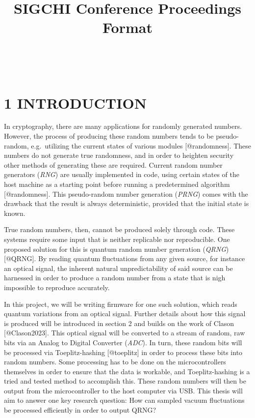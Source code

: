\documentclass{sigchi}
\def\plaintitle{SIGCHI Conference Proceedings Format}
\begin{document}
\title{\plaintitle}

\author{%
	\\
	\\
}

\maketitle

\section{1 INTRODUCTION}\label{introduction}

In cryptography, there are many applications for randomly generated
numbers. However, the process of producing these random numbers tends to
be pseudo-random, e.g.~utilizing the current states of various modules
{[}@randomness{]}. These numbers do not generate true randomness, and in
order to heighten security other methods of generating these are
required. Current random number generators (\emph{RNG}) are usually
implemented in code, using certain states of the host machine as a
starting point before running a predetermined algorithm
{[}@randomness{]}. This pseudo-random number generation (\emph{PRNG})
comes with the drawback that the result is always deterministic,
provided that the initial state is known.

True random numbers, then, cannot be produced solely through code. These
systems require some input that is neither replicable nor reproducible.
One proposed solution for this is quantum random number generation
(\emph{QRNG}) {[}@QRNG{]}. By reading quantum fluctuations from any
given source, for instance an optical signal, the inherent natural
unpredictability of said source can be harnessed in order to produce a
random number from a state that is nigh impossible to reproduce
accurately.

In this project, we will be writing firmware for one such solution,
which reads quantum variations from an optical signal. Further details
about how this signal is produced will be introduced in section 2 and
builds on the work of Clason {[}@Clason2023{]}. This optical signal will
be converted to a stream of random, raw bits via an Analog to Digital
Converter (\emph{ADC}). In turn, these random bits will be processed via
Toeplitz-hashing {[}@toeplitz{]} in order to process these bits into
random numbers. Some processing has to be done on the microcontrollers
themselves in order to ensure that the data is workable, and
Toeplitz-hashing is a tried and tested method to accomplish this. These
random numbers will then be output from the microcontroller to the host
computer via USB. This thesis will aim to answer one key research
question: How can sampled vacuum fluctuations be processed efficiently
in order to output QRNG?
\end{document}
